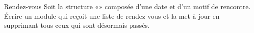 		
			
		




\begin{Exercice}{Rendez-vous}
	Soit la structure «» composée d’une date
	et d’un motif de rencontre. Écrire un module qui reçoit une liste de
	rendez-vous et la met à jour en supprimant tous ceux qui sont désormais
	passés. 
\end{Exercice}
